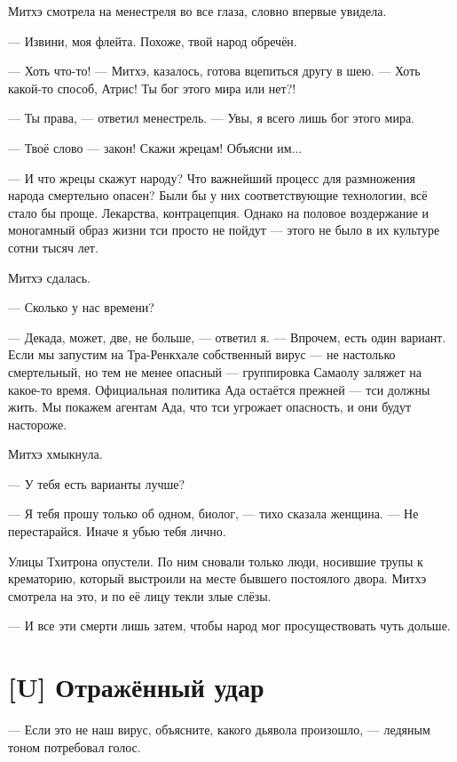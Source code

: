 Митхэ смотрела на менестреля во все глаза, словно впервые увидела.

--- Извини, моя флейта.
Похоже, твой народ обречён.

--- Хоть что-то! --- Митхэ, казалось, готова вцепиться другу в шею.
--- Хоть какой-то способ, Атрис!
Ты бог этого мира или нет?!

--- Ты права, --- ответил менестрель.
--- Увы, я всего лишь бог этого мира.

--- Твоё слово --- закон!
Скажи жрецам!
Объясни им...

--- И что жрецы скажут народу?
Что важнейший процесс для размножения народа смертельно опасен?
Были бы у них соответствующие технологии, всё стало бы проще.
Лекарства, контрацепция.
Однако на половое воздержание и моногамный образ жизни тси просто не пойдут --- этого не было в их культуре сотни тысяч лет.

Митхэ сдалась.

--- Сколько у нас времени?

--- Декада, может, две, не больше, --- ответил я.
--- Впрочем, есть один вариант.
Если мы запустим на Тра-Ренкхале собственный вирус --- не настолько смертельный, но тем не менее опасный --- группировка Самаолу заляжет на какое-то время.
Официальная политика Ада остаётся прежней --- тси должны жить.
Мы покажем агентам Ада, что тси угрожает опасность, и они будут настороже.

Митхэ хмыкнула.

--- У тебя есть варианты лучше?

--- Я тебя прошу только об одном, биолог, --- тихо сказала женщина.
--- Не перестарайся.
Иначе я убью тебя лично.

\asterism

Улицы Тхитрона опустели.
По ним сновали только люди, носившие трупы к крематорию, который выстроили на месте бывшего постоялого двора.
Митхэ смотрела на это, и по её лицу текли злые слёзы.

--- И все эти смерти лишь затем, чтобы народ мог просуществовать чуть дольше.

\textspace

\section{[U] Отражённый удар}

\textspace

--- Если это не наш вирус, объясните, какого дьявола произошло, --- ледяным тоном потребовал голос.

